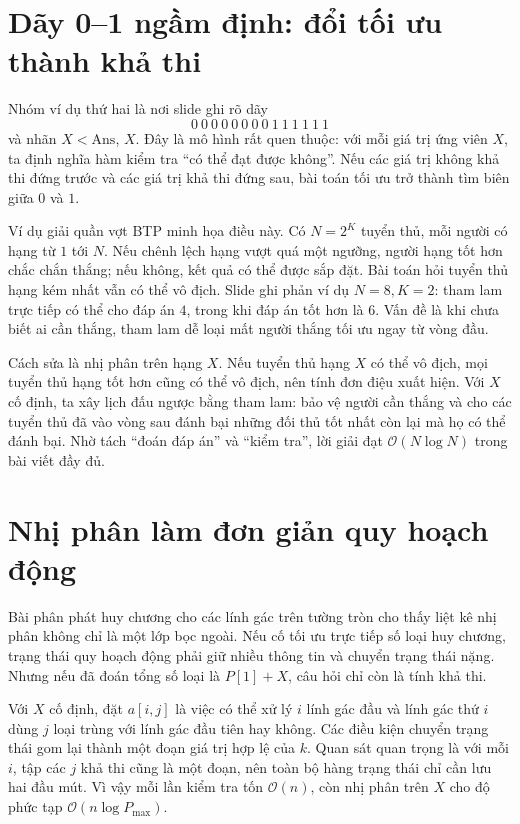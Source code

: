 \documentclass[11pt]{article}
\newcommand{\Oh}{\mathcal{O}}
\newcommand{\Ans}{\mathrm{Ans}}
\begin{document}
\section{Dãy 0--1 ngầm định: đổi tối ưu thành khả thi}

Nhóm ví dụ thứ hai là nơi slide ghi rõ dãy
\[
  0\ 0\ 0\ 0\ 0\ 0\ 0\ 0\ 1\ 1\ 1\ 1\ 1\ 1
\]
và nhãn \(X<\Ans\), \(X\). Đây là mô hình rất quen thuộc: với mỗi giá trị
ứng viên \(X\), ta định nghĩa hàm kiểm tra ``có thể đạt được không''. Nếu các
giá trị không khả thi đứng trước và các giá trị khả thi đứng sau, bài toán
tối ưu trở thành tìm biên giữa \(0\) và \(1\).

Ví dụ giải quần vợt BTP minh họa điều này. Có \(N=2^K\) tuyển thủ, mỗi người
có hạng từ \(1\) tới \(N\). Nếu chênh lệch hạng vượt quá một ngưỡng, người
hạng tốt hơn chắc chắn thắng; nếu không, kết quả có thể được sắp đặt. Bài toán
hỏi tuyển thủ hạng kém nhất vẫn có thể vô địch. Slide ghi phản ví dụ
\(N=8,K=2\): tham lam trực tiếp có thể cho đáp án \(4\), trong khi đáp án tốt
hơn là \(6\). Vấn đề là khi chưa biết ai cần thắng, tham lam dễ loại mất
người thắng tối ưu ngay từ vòng đầu.

Cách sửa là nhị phân trên hạng \(X\). Nếu tuyển thủ hạng \(X\) có thể vô
địch, mọi tuyển thủ hạng tốt hơn cũng có thể vô địch, nên tính đơn điệu xuất
hiện. Với \(X\) cố định, ta xây lịch đấu ngược bằng tham lam: bảo vệ người
cần thắng và cho các tuyển thủ đã vào vòng sau đánh bại những đối thủ tốt
nhất còn lại mà họ có thể đánh bại. Nhờ tách ``đoán đáp án'' và ``kiểm tra'',
lời giải đạt \(\Oh(N\log N)\) trong bài viết đầy đủ.

\section{Nhị phân làm đơn giản quy hoạch động}

Bài phân phát huy chương cho các lính gác trên tường tròn cho thấy liệt kê
nhị phân không chỉ là một lớp bọc ngoài. Nếu cố tối ưu trực tiếp số loại huy
chương, trạng thái quy hoạch động phải giữ nhiều thông tin và chuyển trạng
thái nặng. Nhưng nếu đã đoán tổng số loại là \(P[1]+X\), câu hỏi chỉ còn là
tính khả thi.

Với \(X\) cố định, đặt \(a[i,j]\) là việc có thể xử lý \(i\) lính gác đầu và
lính gác thứ \(i\) dùng \(j\) loại trùng với lính gác đầu tiên hay không. Các
điều kiện chuyển trạng thái gom lại thành một đoạn giá trị hợp lệ của \(k\).
Quan sát quan trọng là với mỗi \(i\), tập các \(j\) khả thi cũng là một đoạn,
nên toàn bộ hàng trạng thái chỉ cần lưu hai đầu mút. Vì vậy mỗi lần kiểm tra
tốn \(\Oh(n)\), còn nhị phân trên \(X\) cho độ phức tạp \(\Oh(n\log P_{\max})\).
\end{document}
